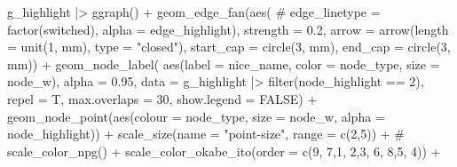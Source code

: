 \documentclass[
  letterpaper,
  DIV=11,
  numbers=noendperiod]{scrartcl}
\newenvironment{Shaded}{\begin{snugshade}}{\end{snugshade}}
\newcommand{\AttributeTok}[1]{\textcolor[rgb]{0.40,0.45,0.13}{#1}}
\newcommand{\CommentTok}[1]{\textcolor[rgb]{0.37,0.37,0.37}{#1}}
\newcommand{\ConstantTok}[1]{\textcolor[rgb]{0.56,0.35,0.01}{#1}}
\newcommand{\DecValTok}[1]{\textcolor[rgb]{0.68,0.00,0.00}{#1}}
\newcommand{\FloatTok}[1]{\textcolor[rgb]{0.68,0.00,0.00}{#1}}
\newcommand{\FunctionTok}[1]{\textcolor[rgb]{0.28,0.35,0.67}{#1}}
\newcommand{\NormalTok}[1]{\textcolor[rgb]{0.00,0.23,0.31}{#1}}
\newcommand{\SpecialCharTok}[1]{\textcolor[rgb]{0.37,0.37,0.37}{#1}}
\newcommand{\StringTok}[1]{\textcolor[rgb]{0.13,0.47,0.30}{#1}}
\begin{document}
\begin{Shaded}
\begin{Highlighting}[]
\NormalTok{    g\_highlight }\SpecialCharTok{|\textgreater{}}
        \FunctionTok{ggraph}\NormalTok{() }\SpecialCharTok{+}
        \FunctionTok{geom\_edge\_fan}\NormalTok{(}\FunctionTok{aes}\NormalTok{(}
            \CommentTok{\# edge\_linetype = factor(switched),}
            \AttributeTok{alpha =}\NormalTok{ edge\_highlight), }
            \AttributeTok{strength =} \FloatTok{0.2}\NormalTok{,}
            \AttributeTok{arrow =} \FunctionTok{arrow}\NormalTok{(}\AttributeTok{length =} \FunctionTok{unit}\NormalTok{(}\DecValTok{1}\NormalTok{, }\StringTok{\textquotesingle{}mm\textquotesingle{}}\NormalTok{),}
                          \AttributeTok{type =} \StringTok{"closed"}\NormalTok{),}
            \AttributeTok{start\_cap =} \FunctionTok{circle}\NormalTok{(}\DecValTok{3}\NormalTok{, }\StringTok{\textquotesingle{}mm\textquotesingle{}}\NormalTok{),}
            \AttributeTok{end\_cap =} \FunctionTok{circle}\NormalTok{(}\DecValTok{3}\NormalTok{, }\StringTok{\textquotesingle{}mm\textquotesingle{}}\NormalTok{)) }\SpecialCharTok{+}
        \FunctionTok{geom\_node\_label}\NormalTok{(}
            \FunctionTok{aes}\NormalTok{(}\AttributeTok{label =}\NormalTok{ nice\_name, }
                \AttributeTok{color =}\NormalTok{ node\_type,}
                \AttributeTok{size =}\NormalTok{ node\_w),}
            \AttributeTok{alpha =} \FloatTok{0.95}\NormalTok{,}
            \AttributeTok{data =}\NormalTok{ g\_highlight }\SpecialCharTok{|\textgreater{}} 
                \FunctionTok{filter}\NormalTok{(node\_highlight }\SpecialCharTok{==} \DecValTok{2}\NormalTok{),}
            \AttributeTok{repel =}\NormalTok{ T, }\AttributeTok{max.overlaps =} \DecValTok{30}\NormalTok{,}
            \AttributeTok{show.legend =} \ConstantTok{FALSE}\NormalTok{) }\SpecialCharTok{+}
        \FunctionTok{geom\_node\_point}\NormalTok{(}\FunctionTok{aes}\NormalTok{(}\AttributeTok{colour =}\NormalTok{ node\_type,}
                            \AttributeTok{size =}\NormalTok{ node\_w,}
                            \AttributeTok{alpha =}\NormalTok{ node\_highlight)) }\SpecialCharTok{+}
        \FunctionTok{scale\_size}\NormalTok{(}\AttributeTok{name =} \StringTok{"point{-}size"}\NormalTok{, }\AttributeTok{range =} \FunctionTok{c}\NormalTok{(}\DecValTok{2}\NormalTok{,}\DecValTok{5}\NormalTok{)) }\SpecialCharTok{+}
        \CommentTok{\# scale\_color\_npg() +}
        \FunctionTok{scale\_color\_okabe\_ito}\NormalTok{(}\AttributeTok{order =} \FunctionTok{c}\NormalTok{(}\DecValTok{9}\NormalTok{, }\DecValTok{7}\NormalTok{,}\DecValTok{1}\NormalTok{, }\DecValTok{2}\NormalTok{,}\DecValTok{3}\NormalTok{, }\DecValTok{6}\NormalTok{, }\DecValTok{8}\NormalTok{,}\DecValTok{5}\NormalTok{, }\DecValTok{4}\NormalTok{)) }\SpecialCharTok{+}

\end{Highlighting}
\end{Shaded}
\end{document}
